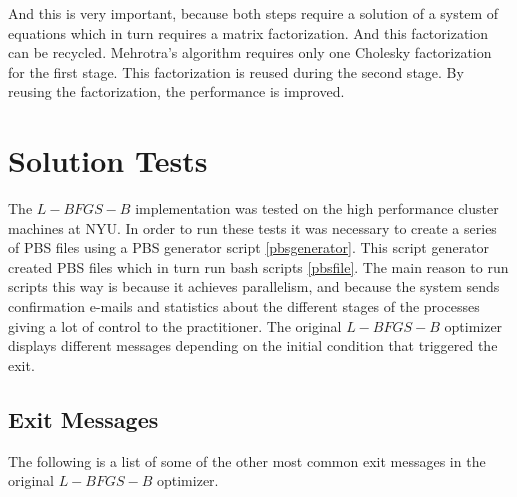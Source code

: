 And this is very important, because both steps require a solution of a system of equations which in turn requires a matrix factorization. And this factorization can be recycled. Mehrotra's algorithm requires only one Cholesky factorization for the first stage. This factorization is reused during the second stage. By reusing the factorization, the performance is improved.

\chapter{Solution Tests}

The $L-BFGS-B$ implementation was tested on the high performance cluster machines at NYU. In order to run these tests it was necessary to create a series of PBS files using a PBS generator script \ref{pbsgenerator}. This script generator created PBS files which in turn run bash scripts \ref{pbsfile}. The main reason to run scripts this way is because it achieves parallelism, and because the system sends confirmation e-mails and statistics about the different stages of the processes giving a lot of control to the practitioner. The original $L-BFGS-B$ optimizer displays different messages depending on the initial condition that triggered the exit.  

\section{Exit Messages}

The following is a list of some of the other most common exit messages in the original $L-BFGS-B$ optimizer.

